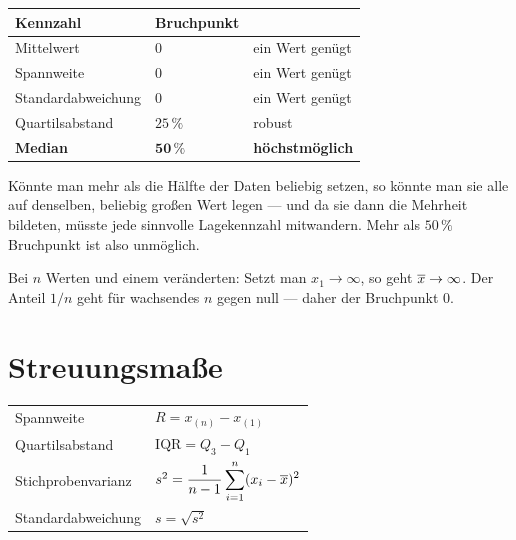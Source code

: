 \begin{merksatz}
\begin{center}
\renewcommand{\arraystretch}{1.48}
\begin{tabular}{@{}P{3.2cm}P{2.0cm}P{2.8cm}@{}}
\toprule
\textbf{Kennzahl} & \textbf{Bruch\-punkt} & \\
\midrule
Mittelwert & $0$ & \textcolor{akzent}{ein Wert genügt}\\
Spannweite & $0$ & \textcolor{akzent}{ein Wert genügt}\\
Standard\-abweichung & $0$ & \textcolor{akzent}{ein Wert genügt}\\
Quartilsabstand & $25\,\%$ & \textcolor{gruen}{robust}\\
\textbf{Median} & $\mathbf{50\,\%}$ & \textcolor{gruen}{\textbf{höchstmöglich}}\\
\bottomrule
\end{tabular}
\end{center}

Könnte man mehr als die Hälfte der Daten beliebig setzen, so könnte man sie alle auf denselben, beliebig großen Wert legen --- und da sie dann die Mehrheit bildeten, müsste jede sinnvolle Lagekennzahl mitwandern. Mehr als $50\,\%$ Bruchpunkt ist also unmöglich.

Bei $n$ Werten und einem veränderten: Setzt man $x_1 \to \infty$, so geht $\overline{x} \to \infty$. Der Anteil $1/n$ geht für wachsendes $n$ gegen null --- daher der Bruchpunkt $0$.
\end{merksatz}

\section{Streuungsmaße}

\begin{definition}
\begin{center}
\renewcommand{\arraystretch}{1.6}
\begin{tabular}{@{}P{3.6cm}P{4.8cm}@{}}
\toprule
Spannweite & $R = x_{(n)} - x_{(1)}$\\
Quartilsabstand & $\mathrm{IQR} = Q_3 - Q_1$\\
Stichprobenvarianz & $s^2 = \dfrac{1}{n-1}\displaystyle\sum_{i=1}^n (x_i - \overline{x})^2$\\
Standardabweichung & $s = \sqrt{s^2}$\\
\bottomrule
\end{tabular}
\end{center}
\end{definition}

